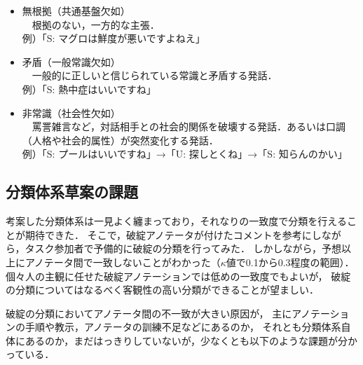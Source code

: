 \documentclass[japanese]{jnlp_1.4}
\begin{document}
\begin{itemize}
\item 無根拠（共通基盤欠如）\\
　根拠のない，一方的な主張．\\
例）「S: マグロは鮮度が悪いですよねえ」

\item 矛盾（一般常識欠如）\\
　一般的に正しいと信じられている常識と矛盾する発話．\\
例）「S: 熱中症はいいですね」

\item 非常識（社会性欠如）\\
　罵詈雑言など，対話相手との社会的関係を破壊する発話．あるいは口調（人格や社会的属性）が突然変化する発話．\\
例）「S: プールはいいですね」→「U: 探しとくね」→「S: 知らんのかい」

\end{itemize}


\subsection{分類体系草案の課題}

考案した分類体系は一見よく纏まっており，それなりの一致度で分類を行えることが期待できた．
そこで，破綻アノテータが付けたコメントを参考にしながら，タスク参加者で予備的に破綻の分類を行ってみた．
しかしながら，予想以上にアノテータ間で一致しないことがわかった（$\kappa$値で0.1から0.3程度の範囲）．
個々人の主観に任せた破綻アノテーションでは低めの一致度でもよいが，
破綻の分類についてはなるべく客観性の高い分類ができることが望ましい．

破綻の分類においてアノテータ間の不一致が大きい原因が，
主にアノテーションの手順や教示，アノテータの訓練不足などにあるのか，
それとも分類体系自体にあるのか，まだはっきりしていないが，少なくとも以下のような課題が分かっている．
\end{document}
